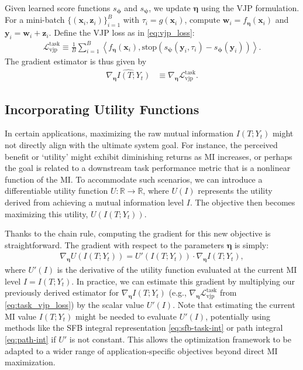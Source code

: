 \documentclass[conference]{IEEEtran}
\newcommand{\R}{\mathbb{R}}
\newcommand{\Yt}{Y_t}
\begin{document}
Given learned score functions $s_{\bm \phi}$ and $s_{\bm \psi}$, we update $\bm \eta$ using the VJP formulation. For a mini-batch $\{(\bm x_i, \bm z_i)\}_{i=1}^B$ with $\tau_i = g(\bm x_i)$, compute $\bm w_i = f_{\bm \eta}(\bm x_i)$ and $\bm y_i = \bm w_i + \bm z_i$. Define the VJP loss as in \eqref{eq:vjp_loss}:
\begin{align}
\mathcal{L}_{\text{vjp}}^{\text{task}} \equiv \frac{1}{B}\sum_{i=1}^B \left\langle f_{\bm \eta}(\bm{x}_i), \text{stop}\left(s_{\bm \psi}(\bm{y}_i, \tau_i) - s_{\bm \phi}(\bm{y}_i)\right) \right\rangle.
\label{eq:task_vjp_loss}
\end{align}
The gradient estimator is thus given by
\begin{align}
\widehat{\nabla_{\bm \eta} I(T; \Yt)} &\equiv \nabla_{\bm \eta} \mathcal{L}_{\text{vjp}}^{\text{task}}.
\end{align}

\subsection{Incorporating Utility Functions}
\label{subsubsec:utility}

In certain applications, maximizing the raw mutual information $I(T;Y_t)$ 
might not directly align with the ultimate system goal. 
For instance, the perceived benefit or `utility' might exhibit diminishing 
returns as MI increases, 
or perhaps the goal is related to a downstream task performance metric 
that is a nonlinear function of the MI. 
To accommodate such scenarios, we can introduce a differentiable utility 
function $U: \R \to \R$, where $U(I)$ represents 
the utility derived from achieving a mutual information level $I$. 
The objective then becomes maximizing this utility, $U(I(T;Y_t))$.

Thanks to the chain rule, computing the gradient for this new objective 
is straightforward. The gradient with respect to the parameters $\bm \eta$ 
is simply:
\begin{align}
\nabla_{\bm \eta} U(I(T;Y_t)) = U'(I(T;Y_t)) \cdot \nabla_{\bm \eta} I(T;Y_t),
\label{eq:utility_gradient}
\end{align}
where $U'(I)$ is the derivative of the utility function evaluated 
at the current MI level $I=I(T;Y_t)$. 
In practice, we can estimate this gradient by multiplying our 
previously derived estimator 
for $\nabla_{\bm \eta} I(T;Y_t)$ (e.g., $\nabla_{\bm \eta} 
\mathcal{L}_{\text{vjp}}^{\text{task}}$ 
from \eqref{eq:task_vjp_loss}) by 
the scalar value $U'(I)$. 
Note that estimating the current MI value $I(T;Y_t)$ 
might be needed to evaluate $U'(I)$, 
potentially using methods like the SFB integral 
representation \eqref{eq:sfb-task-int} or path integral \eqref{eq:path-int} 
if $U'$ is not constant. 
This allows the optimization framework to be adapted to 
a wider range of application-specific objectives beyond direct MI maximization.
\end{document}
